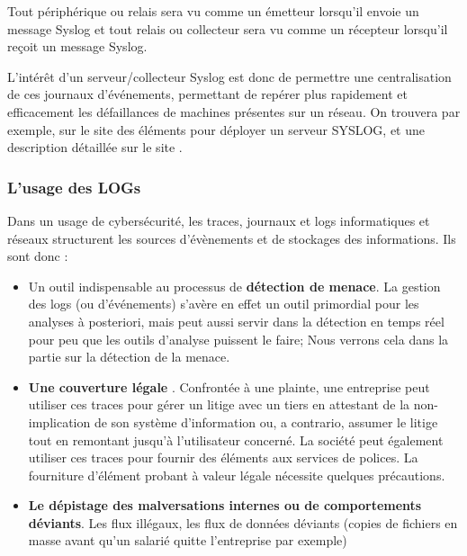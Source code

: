 Tout périphérique ou relais sera vu comme un émetteur lorsqu'il envoie un message Syslog et tout relais ou collecteur sera vu comme un récepteur lorsqu'il reçoit un message Syslog.

L'intérêt d'un serveur/collecteur Syslog est donc de permettre une centralisation de ces journaux d'événements, permettant de repérer plus rapidement et efficacement les défaillances de machines présentes sur un réseau. On trouvera par exemple, sur le site 
 des éléments pour déployer un serveur SYSLOG, et une description détaillée sur le site .

 \subsubsection{L'usage des LOGs}
 
 
 Dans un usage de cybersécurité, les traces, journaux et logs informatiques et réseaux structurent les sources d'évènements et de stockages des informations. Ils sont donc :
 
 \begin{itemize}

   \item Un outil indispensable au processus de \textbf{détection de menace}. La gestion des logs (ou d’événements) s’avère en effet un outil primordial pour les analyses à posteriori, mais peut aussi servir dans la détection en temps réel pour peu que les outils d'analyse puissent le faire; Nous verrons cela dans la partie sur la détection de la menace.

   \item  \textbf{Une couverture légale }. Confrontée à une plainte, une entreprise peut utiliser ces traces pour gérer un litige avec un tiers  en attestant de la non-implication de son système d’information ou, a contrario, assumer le litige tout en remontant jusqu’à l’utilisateur concerné. La société peut également utiliser ces traces pour fournir des éléments aux services de polices. La fourniture d'élément probant à valeur légale nécessite quelques précautions. 

   \item  \textbf{Le dépistage des malversations internes ou de comportements déviants}. Les flux illégaux, les flux de données déviants (copies de fichiers en masse avant qu'un salarié quitte l'entreprise par exemple)

\end{itemize}


